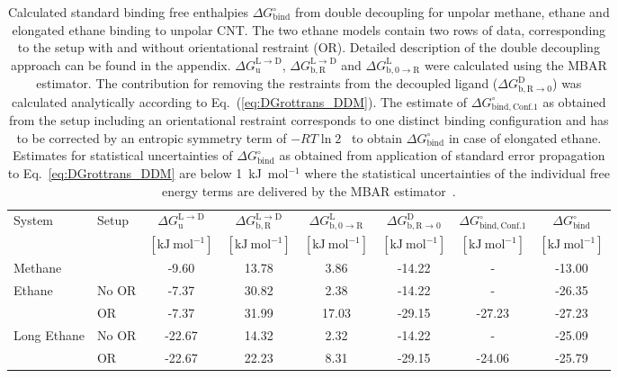 \documentclass[9pt,lessons]{livecoms}
\begin{document}
\begin{table}[htb!]
\caption{\label{tbl:DDM} 
Calculated standard binding free enthalpies $\Delta G^\circ_\mathrm{bind}$ from  double decoupling for unpolar methane, ethane and elongated ethane binding to unpolar CNT.
The two ethane models contain two rows of data, corresponding to the setup with and without orientational restraint (OR).
Detailed description of the double decoupling approach can be found in the appendix.
$\Delta G^\mathrm{L \rightarrow D}_\mathrm{u}$, $\Delta G^\mathrm{L \rightarrow D}_\mathrm{b, R}$ and $\Delta G^\mathrm{L}_\mathrm{b, 0 \rightarrow R}$ were calculated using the MBAR estimator.
The contribution for removing the restraints from the decoupled ligand ($\Delta G^\mathrm{D}_\mathrm{b, R \rightarrow 0}$) was calculated analytically according to Eq.~(\ref{eq:DGrottrans_DDM}).
The estimate of $\Delta G^\circ_\mathrm{bind, Conf. 1}$ as obtained from the setup including an orientational restraint corresponds to one distinct binding configuration and has to be corrected 
by an entropic symmetry term of $-RT \ln 2$~\cite{gilson2013correction, hermans1997inclusion} to obtain $\Delta G^\circ_\mathrm{bind}$ in case of elongated ethane.
Estimates for statistical uncertainties of $\Delta G^\circ_\mathrm{bind}$ as obtained from application of standard error propagation to Eq.~\ref{eq:DGrottrans_DDM} are below 1~kJ~mol$^{-1}$ where 
the statistical uncertainties of the individual free energy terms are delivered by the MBAR estimator~\cite{shirts2008statistically}.
}
\centering
\begin{tabular}{llc ccc cc}\hline
System & Setup & $\Delta G^\mathrm{L \rightarrow D}_\mathrm{u}$ & $\Delta G^\mathrm{L \rightarrow D}_\mathrm{b, R}$ & $\Delta G^\mathrm{L}_\mathrm{b, 0 \rightarrow R}$ & 
$\Delta G^\mathrm{D}_\mathrm{b, R \rightarrow 0}$ & $\Delta G^\circ_\mathrm{bind, Conf. 1}$ & $\Delta G^\circ_\mathrm{bind}$ \\
& & $[\mathrm{kJ~mol}^{-1}]$ & $[\mathrm{kJ~mol}^{-1}]$ & $[\mathrm{kJ~mol}^{-1}]$ & $[\mathrm{kJ~mol}^{-1}]$ & $[\mathrm{kJ~mol}^{-1}]$ & $[\mathrm{kJ~mol}^{-1}]$ \\ 
\hline
Methane 						& & -9.60	& 13.78	& 3.86 & -14.22 & - & -13.00 \\
\hline
\multirow{ 2}{*}{Ethane}  	& No OR & -7.37 & 30.82 & 2.38 & -14.22 & - & -26.35 \\
					& OR       & -7.37 & 31.99 & 17.03 & -29.15 & -27.23 & -27.23 \\
\hline
\multirow{ 2}{*}{Long Ethane}  & No OR & -22.67 & 14.32 & 2.32 & -14.22 & - & -25.09\\  
					      & OR       & -22.67 & 22.23 & 8.31 & -29.15 & -24.06 & -25.79\\
\hline
\end{tabular}
\end{table}
\end{document}
